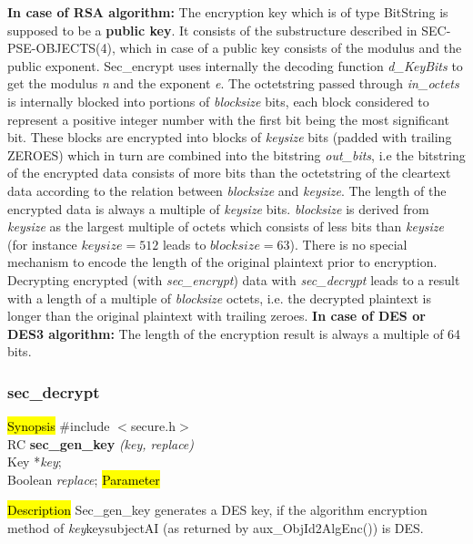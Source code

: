 {\bf In case of RSA algorithm:}
\be
\m The encryption key which is of type BitString is supposed to be
   a {\bf public key}. It consists of the substructure described in
   SEC-PSE-OBJECTS(4), which in case of a public key consists of the
   modulus and the public exponent. Sec\_encrypt uses internally the
   decoding function {\em d\_KeyBits} to get the modulus {\em n} and the exponent {\em e}.
\m The octetstring passed through {\em in\_octets} is internally blocked into portions of
   {\em blocksize} bits, each block considered to represent a positive integer number with the first bit
   being the most significant bit. These blocks are encrypted into blocks of {\em keysize} bits
   (padded with trailing ZEROES) which in turn are combined into the bitstring {\em out\_bits}, i.e
   the bitstring of the encrypted data consists of more bits than the octetstring of the cleartext data
   according to the relation between {\em blocksize} and {\em keysize}. 
   The length of the encrypted data is always a multiple of {\em keysize} bits. 
   {\em blocksize} is derived from {\em keysize} as the largest multiple of octets which consists of
   less bits than {\em keysize} (for instance $keysize = 512$ leads to $blocksize = 63$).
\m There is no special mechanism to encode the length of the original plaintext prior
   to encryption. Decrypting encrypted (with {\em sec\_encrypt}) data with {\em sec\_decrypt}
   leads to a result with a length of a multiple of {\em blocksize} octets, i.e. the decrypted
   plaintext is longer than the original plaintext with trailing zeroes.
\ee
{\bf In case of DES or DES3 algorithm:}
   The length of the encryption result is always a multiple of 64 bits.


\subsubsection{sec\_decrypt}
\label{sec_gen_key}
\hl{Synopsis}
\#include $<$secure.h$>$ \\ [0.5cm]
RC {\bf sec\_gen\_key} {\em (key, replace)} \\
Key *{\em key}; \\
Boolean {\em replace};
\hl{Parameter}


\hl{Description}
Sec\_gen\_key generates a
\bi
\m  DES key, 
    if the algorithm encryption method 
    of {\em key}\pf key\pf subjectAI (as returned by aux\_ObjId2AlgEnc()) is DES. 

